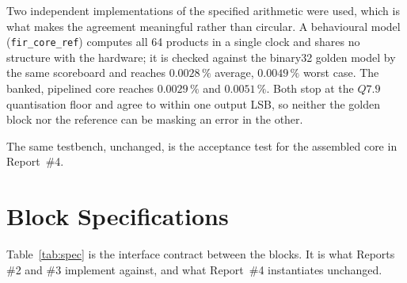 \documentclass[conference]{IEEEtran}
\newcommand{\qf}[2]{Q#1.#2}
\begin{document}
Two independent implementations of the specified arithmetic were used, which
is what makes the agreement meaningful rather than circular. A behavioural
model (\texttt{fir\_core\_ref}) computes all 64 products in a single clock and
shares no structure with the hardware; it is checked against the binary32
golden model by the same scoreboard and reaches $0.0028\,\%$ average,
$0.0049\,\%$ worst case. The banked, pipelined core reaches $0.0029\,\%$ and
$0.0051\,\%$. Both stop at the $\qf{7}{9}$ quantisation floor and agree to
within one output LSB, so neither the golden block nor the reference can be
masking an error in the other.

The same testbench, unchanged, is the acceptance test for the assembled core
in Report~\#4.

\section{Block Specifications}\label{sec:spec}

Table~\ref{tab:spec} is the interface contract between the blocks. It is what
Reports \#2 and \#3 implement against, and what Report~\#4 instantiates
unchanged.
\end{document}
